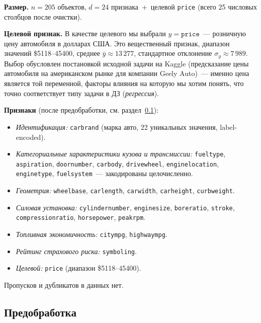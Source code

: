 \documentclass[12pt,a4paper]{article}
\begin{document}
\textbf{Размер.} $n = 205$ объектов, $d = 24$ признака~+~целевой
\texttt{price} (всего 25 числовых столбцов после очистки).

\textbf{Целевой признак.} В качестве целевого мы выбрали
$y = \texttt{price}$~--- розничную цену автомобиля в долларах США.
Это вещественный признак, диапазон значений \$5118--45400, среднее
$\bar{y} \approx 13\,277$, стандартное отклонение $\sigma_y \approx 7\,989$.
Выбор обусловлен постановкой исходной задачи на Kaggle (предсказание
цены автомобиля на американском рынке для компании Geely Auto)~---
именно цена является той переменной, факторы влияния на которую мы
хотим понять, что точно соответствует типу задачи в ДЗ
(\emph{регрессия}).

\textbf{Признаки} (после предобработки, см. раздел~\ref{sec:prep}):
\begin{itemize}\setlength\itemsep{0pt}
  \item \emph{Идентификация:} \texttt{carbrand} (марка авто, 22
        уникальных значения, label-encoded).
  \item \emph{Категориальные характеристики кузова и трансмиссии:}
        \texttt{fueltype}, \texttt{aspiration}, \texttt{doornumber},
        \texttt{carbody}, \texttt{drivewheel}, \texttt{enginelocation},
        \texttt{enginetype}, \texttt{fuelsystem}~--- закодированы
        целочисленно.
  \item \emph{Геометрия:} \texttt{wheelbase}, \texttt{carlength},
        \texttt{carwidth}, \texttt{carheight}, \texttt{curbweight}.
  \item \emph{Силовая установка:} \texttt{cylindernumber},
        \texttt{enginesize}, \texttt{boreratio}, \texttt{stroke},
        \texttt{compressionratio}, \texttt{horsepower},
        \texttt{peakrpm}.
  \item \emph{Топливная экономичность:} \texttt{citympg},
        \texttt{highwaympg}.
  \item \emph{Рейтинг страхового риска:} \texttt{symboling}.
  \item \emph{Целевой:} \texttt{price} (диапазон \$5118--45400).
\end{itemize}

Пропусков и дубликатов в данных нет.

\subsection{Предобработка}\label{sec:prep}
\end{document}
